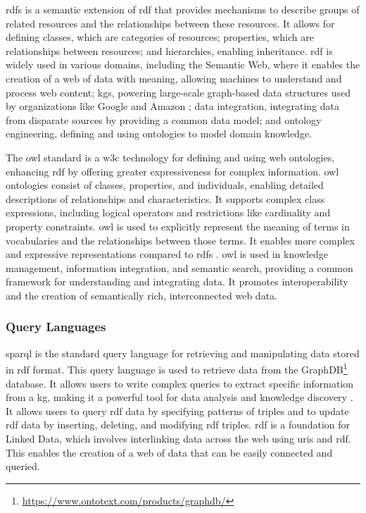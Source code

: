 \gls{rdfs} is a semantic extension of \gls{rdf} that provides mechanisms to describe groups of related resources and the relationships between these resources. It allows for defining classes, which are categories of resources; properties, which are relationships between resources; and hierarchies, enabling inheritance.
\gls{rdf} is widely used in various domains, including the Semantic Web, where it enables the creation of a web of data with meaning, allowing machines to understand and process web content; \glspl{kg}, powering large-scale graph-based data structures used by organizations like Google and Amazon \cite{Kejriwal2022}; data integration, integrating data from disparate sources by providing a common data model; and ontology engineering, defining and using ontologies to model domain knowledge.

The \gls{owl} standard is a \gls{w3c} technology for defining and using web ontologies, enhancing \gls{rdf} by offering greater expressiveness for complex information. \gls{owl} ontologies consist of classes, properties, and individuals, enabling detailed descriptions of relationships and characteristics. It supports complex class expressions, including logical operators and restrictions like cardinality and property constraints.
\gls{owl} is used to explicitly represent the meaning of terms in vocabularies and the relationships between those terms. It enables more complex and expressive representations compared to \gls{rdfs} \cite{Deborah2004}.
\gls{owl} is used in knowledge management, information integration, and semantic search, providing a common framework for understanding and integrating data. It promotes interoperability and the creation of semantically rich, interconnected web data.

\subsubsection*{Query Languages}
\gls{sparql} is the standard query language for retrieving and manipulating data stored in \gls{rdf} format.
This query language is used to retrieve data from the GraphDB\footnote{\url{https://www.ontotext.com/products/graphdb/}} database.
It allows users to write complex queries to extract specific information from a \gls{kg}, making it a powerful tool for data analysis and knowledge discovery \cite{Jorge2009}.
It allows users to query \gls{rdf} data by specifying patterns of triples and to update \gls{rdf} data by inserting, deleting, and modifying \gls{rdf} triples. \gls{rdf} is a foundation for Linked Data, which involves interlinking data across the web using \glspl{uri} and \gls{rdf}. This enables the creation of a web of data that can be easily connected and queried.

